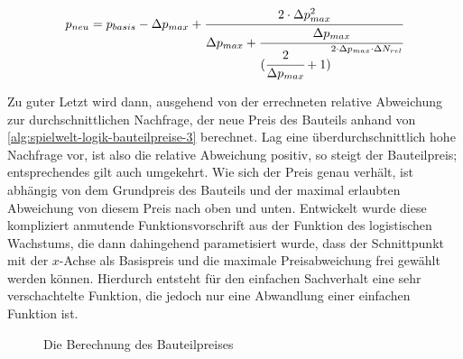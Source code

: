 \begin{equation}
p_{neu} = p_{basis} -\Delta{}p_{max} + \cfrac{2 \cdot \Delta{}p_{max}^2}{\Delta{}p_{max} + \cfrac{\Delta{}p_{max}}{({\cfrac{2}{\Delta{}p_{max}} + 1)}^{2 \cdot \Delta{}p_{max} \cdot \Delta{}N_{rel}}}}
\label{alg:spielwelt-logik-bauteilpreise-3}
\end{equation}

Zu guter Letzt wird dann, ausgehend von der errechneten relative Abweichung zur durchschnittlichen Nachfrage, der neue Preis des Bauteils anhand von \ref{alg:spielwelt-logik-bauteilpreise-3} berechnet. Lag eine überdurchschnittlich hohe Nachfrage vor, ist also die relative Abweichung positiv, so steigt der Bauteilpreis; entsprechendes gilt auch umgekehrt. Wie sich der Preis genau verhält, ist abhängig von dem Grundpreis des Bauteils und der maximal erlaubten Abweichung von diesem Preis nach oben und unten. Entwickelt wurde diese kompliziert anmutende Funktionsvorschrift aus der Funktion des logistischen Wachstums, die dann dahingehend parametisiert wurde, dass der Schnittpunkt mit der $x$-Achse als Basispreis und die maximale Preisabweichung frei gewählt werden können. Hierdurch entsteht für den einfachen Sachverhalt eine sehr verschachtelte Funktion, die jedoch nur eine Abwandlung einer einfachen Funktion ist.

\newcommand{\pbasis}{3.5}
\newcommand{\pdelta}{2.5}
\begin{figure}[ht]
\centering
{}
\caption{Die Berechnung des Bauteilpreises}
\label{img:spielwelt-logik-bauteilpreise-graph}
\end{figure}


